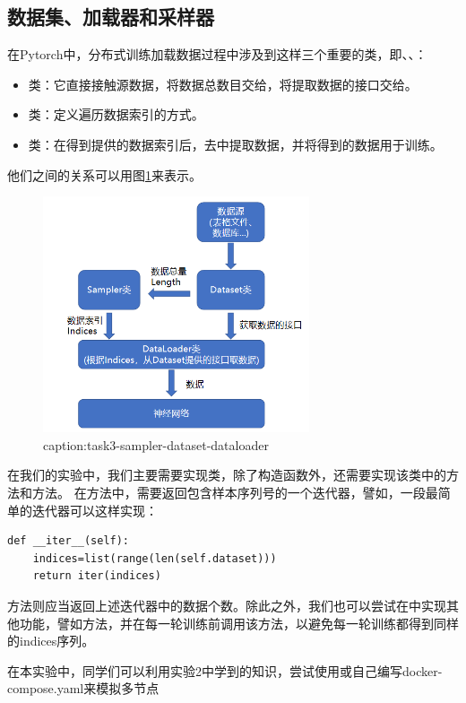 \subsection{数据集、加载器和采样器}

在Pytorch中，分布式训练加载数据过程中涉及到这样三个重要的类，即、、：
\begin{itemize}
    \item {}类：它直接接触源数据，将数据总数目交给，将提取数据的接口交给。
    \item {}类：定义遍历数据索引的方式。
    \item {}类：在得到提供的数据索引后，去中提取数据，并将得到的数据用于训练。
\end{itemize}

他们之间的关系可以用图\ref{fig:task3-sampler-dataset-dataloader}来表示。
\begin{figure}[htbp]
	\centering
	\includegraphics[width=0.7\textwidth]{figures/task3-sampler-dataset-dataloader.png}
	\caption{caption:task3-sampler-dataset-dataloader}
	\label{fig:task3-sampler-dataset-dataloader}
\end{figure}

在我们的实验中，我们主要需要实现类，除了构造函数外，还需要实现该类中的方法和方法。
在方法中，需要返回包含样本序列号的一个迭代器，譬如，一段最简单的迭代器可以这样实现：
\begin{lstlisting}
def __iter__(self):
    indices=list(range(len(self.dataset)))
    return iter(indices)
\end{lstlisting}

方法则应当返回上述迭代器中的数据个数。除此之外，我们也可以尝试在中实现其他功能，譬如方法，并在每一轮训练前调用该方法，以避免每一轮训练都得到同样的indices序列。


在本实验中，同学们可以利用实验2中学到的知识，尝试使用或自己编写docker-compose.yaml来模拟多节点~

